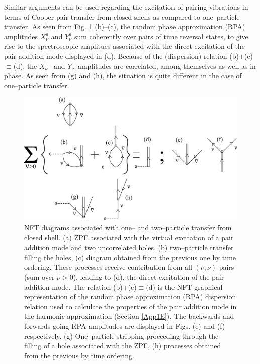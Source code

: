 Similar arguments can be used regarding the excitation of pairing vibrations in terms of Cooper pair transfer from closed shells as compared to one--particle transfer. As seen from Fig. \ref{fig2.1.5} (b)--(c), the random phase approximation (RPA) amplitudes $X_\nu^a$ and $Y^a_\nu$ sum coherently over pairs of time reversal states, to give rise to the spectroscopic amplitues associated with the direct excitation of the pair addition mode displayed in (d). Because of the (dispersion) relation (b)+(c)$\equiv$(d), the $X_\nu$-- and $Y_\nu$--amplitudes are correlated, among themselves as well as in phase. As seen from (g) and (h), the situation is quite different in the case of one--particle transfer. 
\begin{figure}[h!]
\centerline {
\includegraphics*[width=15cm]{nutshell/figs/fig2_1_5}
}
\caption{NFT diagrams associated with one-- and two--particle transfer from closed shell. (a) ZPF associated with the virtual excitation of a pair addition mode and two uncorrelated holes. (b) two--particle transfer filling the holes, (c) diagram obtained from the previous one by time ordering. These processes receive contribution from all $(\nu,\bar\nu)$ pairs (sum over $\nu>0$), leading to (d), the direct excitation of the pair addition mode. The relation (b)+(c)$\equiv$(d) is the NFT graphical representation of the random phase approximation (RPA) dispersion relation used to calculate the properties of the pair addition mode in the harmonic approximation (Section \ref{App1E}). The backwards and forwards going RPA amplitudes are displayed in Figs. (e) and (f) respectively. (g) One--particle stripping proceeding through the filling of a hole associated with the ZPF, (h) processes obtained from the previous by time ordering.}
\label{fig2.1.5}
\end{figure}
